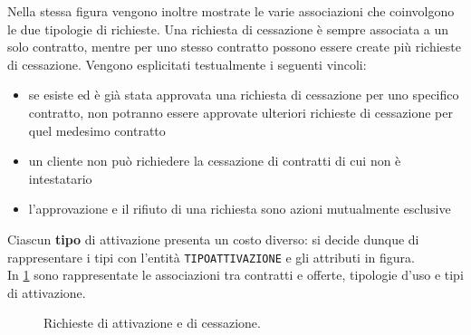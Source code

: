 \documentclass[a4paper,12pt]{report}
\begin{document}
Nella stessa figura vengono inoltre mostrate le varie associazioni che coinvolgono le due tipologie di richieste. Una richiesta di cessazione è sempre associata a un solo contratto, mentre per uno stesso contratto possono essere create più richieste di cessazione.
\newline
Vengono esplicitati testualmente i seguenti vincoli:
\begin{itemize}
    \item se esiste ed è già stata approvata una richiesta di cessazione per uno specifico contratto, non potranno essere approvate ulteriori richieste di cessazione per quel medesimo contratto
    \item un cliente non può richiedere la cessazione di contratti di cui non è intestatario
    \item l'approvazione e il rifiuto di una richiesta sono azioni mutualmente esclusive
\end{itemize}
Ciascun \textbf{tipo} di attivazione presenta un costo diverso: si decide dunque di rappresentare i tipi con l'entità \texttt{TIPO\textunderscore ATTIVAZIONE} e gli attributi in figura.\\[10pt]
In \cref{fig:requests-activation} sono rappresentate le associazioni tra contratti e offerte, tipologie d'uso e tipi di attivazione.

\begin{figure}[H]
\centering{}
\caption{Richieste di attivazione e di cessazione.}
\label{fig:requests-activation}
\end{figure}
\end{document}
